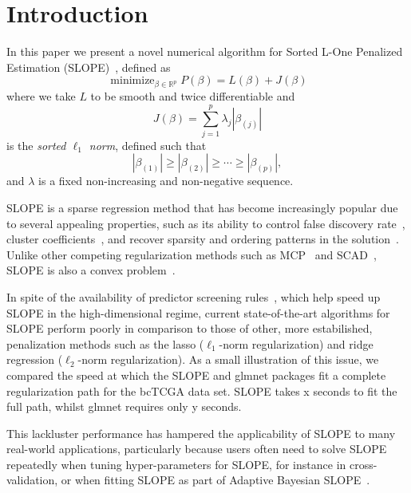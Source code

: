 \section{Introduction}\label{sec:introduction}

In this paper we present a novel numerical algorithm for Sorted L-One Penalized
Estimation (SLOPE)~\cite{bogdan2013, bogdan2015}, defined as
\begin{equation}
  \label{eq:slope-problem}
  \operatorname{minimize}_{\beta \in \mathbb{R}^p}
  P(\beta) = L(\beta) + J(\beta)
\end{equation}
where we take \(L\) to be smooth and twice differentiable and
\begin{equation}
  \label{eq:sorted-l1-norm}
  J(\beta) = \sum_{j=1}^p \lambda_j|\beta_{(j)}|
\end{equation}
is the \emph{sorted \(\ell_1\) norm}, defined such that
\[
  |\beta_{(1)}| \geq |\beta_{(2)}| \geq \cdots \geq |\beta_{(p)}|,
\]
and \(\lambda\) is a fixed non-increasing and non-negative sequence.

SLOPE is a sparse regression method that has become increasingly popular due to
several appealing properties, such as its ability to control false discovery
rate~\cite{bogdan2015, kos2020}, cluster coefficients~\cite{figueiredo2016,
schneider2020a}, and recover sparsity and ordering patterns in the
solution~\cite{bogdan2022}. Unlike other competing regularization methods such
as MCP~\cite{zhang2010} and SCAD~\cite{fan2001}, SLOPE is also a convex
problem~\cite{bogdan2015}.

In spite of the availability of predictor screening rules~\cite{elvira2022,
larsson2020c}, which help speed up SLOPE in the high-dimensional regime,
current state-of-the-art algorithms for SLOPE perform poorly in comparison to
those of other, more estabilished, penalization methods such as the lasso
(\(\ell_1\)-norm regularization) and ridge regression (\(\ell_2\)-norm
regularization). As a small illustration of this issue, we compared the
speed at which the SLOPE and glmnet packages fit a complete regularization
path for the bcTCGA data set. SLOPE takes x seconds to fit the full path,
whilst glmnet requires only y seconds.

This lackluster performance has hampered the applicability of SLOPE to many
real-world applications, particularly because users often need to solve SLOPE
repeatedly when tuning hyper-parameters for SLOPE, for instance in
cross-validation, or when fitting SLOPE as part of Adaptive Bayesian
SLOPE~\cite{jiang2022}.

